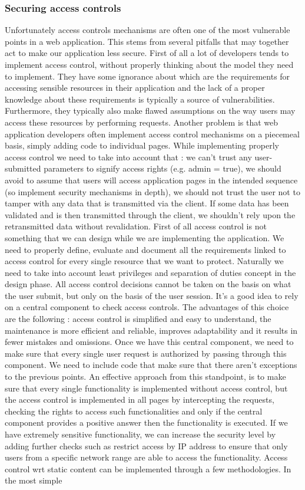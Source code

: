 \subsubsection{Securing access controls}
Unfortunately access controls mechanisms are often one of the most vulnerable points in a web application. This stems from several pitfalls that may together act to make our application less secure. First of all a lot of developers tends to implement access control, without properly thinking about the model they need to implement. They have some ignorance about which are the requirements for accessing sensible resources in their application and the lack of a proper knowledge about these requirements is typically a source of vulnerabilities. Furthermore, they typically also make flawed assumptions on the way users may access these resources by performing requests. Another problem is that web application developers often implement access control mechanisms on a piecemeal basis, simply adding code to individual pages. While implementing properly access control we need to take into account that : we can't trust any user-submitted parameters to signify access rights (e.g. admin = true), we should avoid to assume that users will access application pages in the intended sequence (so implement security mechanisms in depth), we should not trust the user not to tamper with any data that is transmitted via the client. If some data has been validated and is then transmitted through the client, we shouldn't rely upon the retransmitted data without revalidation. First of all access control is not something that we can design while we are implementing the application. We need to properly define, evaluate and document all the requirements linked to access control for every single resource that we want to protect. Naturally we need to take into account least privileges and separation of duties concept in the design phase. All access control decisions cannot be taken on the basis on what the user submit, but only on the basis of the user session. It's a good idea to rely on a central component to check access controls. The advantages of this choice are the following : access control is simplified and easy to understand, the maintenance is more efficient and reliable, improves adaptability and it results in fewer mistakes and omissions. Once we have this central component, we need to make sure that every single user request is authorized by passing through this component. We need to include code that make sure that there aren't exceptions to the previous points. An effective approach from this standpoint, is to make sure that every single functionality is implemented without access control, but the access control is implemented in all pages by intercepting the requests, checking the rights to access such functionalities and only if the central component provides a positive answer then the functionality is executed. If we have extremely sensitive functionality, we can increase the security level by adding further checks such as restrict access by IP address to ensure that only users from a specific network range are able to access the functionality. Access control wrt static content can be implemented through a few methodologies. In the most simple 